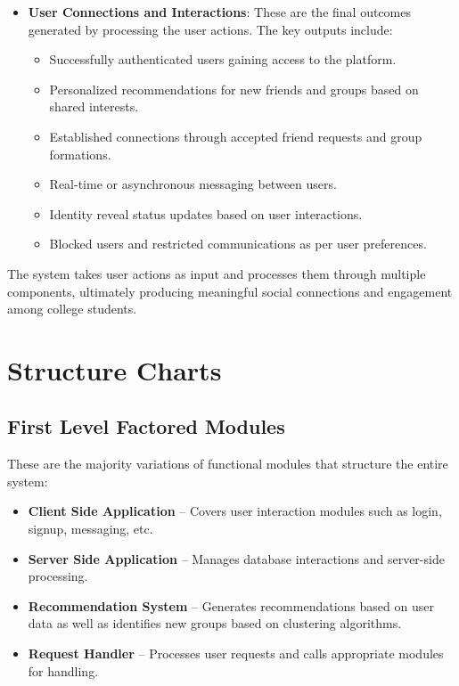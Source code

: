 \documentclass[12pt,a4paper]{article}
\begin{document}
\begin{itemize}
    \item \textbf{User Connections and Interactions}: These are the final outcomes generated by processing the user actions. The key outputs include:
    \begin{itemize}
        \item Successfully authenticated users gaining access to the platform.
        \item Personalized recommendations for new friends and groups based on shared interests.
        \item Established connections through accepted friend requests and group formations.
        \item Real-time or asynchronous messaging between users.
        \item Identity reveal status updates based on user interactions.
        \item Blocked users and restricted communications as per user preferences.
    \end{itemize}
\end{itemize}

The system takes user actions as input and processes them through multiple components, ultimately producing meaningful social connections and engagement among college students.



\section{Structure Charts}
\subsection{First Level Factored Modules}
These are the majority variations of functional modules that structure the entire system:

\begin{itemize}
    \item \textbf{Client Side Application} – Covers user interaction modules such as login, signup, messaging, etc.
    \item \textbf{Server Side Application} – Manages database interactions and server-side processing.
    \item \textbf{Recommendation System} – Generates recommendations based on user data as well as identifies new groups based on clustering algorithms.
    \item \textbf{Request Handler} – Processes user requests and calls appropriate modules for handling.
\end{itemize}
\end{document}

